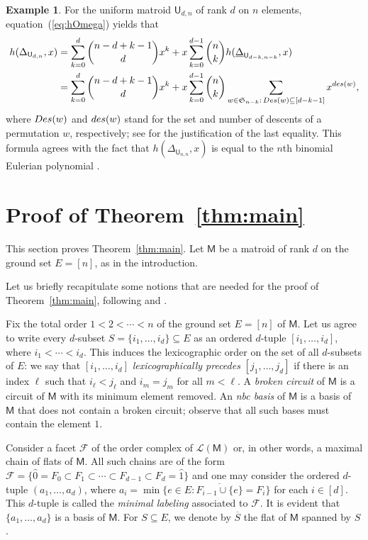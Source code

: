 \documentclass[11pt]{amsart}
\theoremstyle{theorems}
\theoremstyle{definition}
\newtheorem{example}[theorem]{Example}
\newcommand{\des}{{\rm des}}
\newcommand{\Des}{{\rm Des}}
\newcommand{\fS}{{\mathfrak S}}
\newcommand{\M}{{\mathsf{M}}}
\newcommand{\U}{{\mathsf{U}}}
\newcommand{\uDelta}{\underline{\Delta}}
\begin{document}
\begin{example} \label{ex:uniform-h} \rm
For the uniform matroid $\U_{d,n}$ of rank $d$ on $n$ elements, 
equation~(\ref{eq:hOmega}) yields that
%
\begin{align*} 
h(\Delta_{\U_{d,n}}, x) & = \sum_{k=0}^d \binom{n-d+k-1}{d} x^k 
 + x \sum_{k=0}^{d-1} \binom{n}{k} h(\uDelta_{\U_{d-k,n-k}},x) \\ 
	                      & = \sum_{k=0}^d \binom{n-d+k-1}{d} x^k 
 + x \sum_{k=0}^{d-1} \binom{n}{k} \sum_{w \in \fS_{n-k}: \, 
                      \Des(w) \subseteq [d-k-1]} x^{\des(w)},
\end{align*}
%
where $\Des(w)$ and $\des(w)$ stand for the set and number of 
descents of a permutation $w$, respectively; see 
\cite[Example~2.2]{ADK24} for the justification of the last 
equality. This formula agrees with 
the fact that $h(\Delta_{\U_{n,n}}, x)$ is equal to the $n$th 
binomial Eulerian polynomial \cite[Example~5]{BKR22} 
\cite[Section~10.4]{PRW08}. 
\end{example}

\section{Proof of Theorem~\ref{thm:main}}
\label{sec:proof}

This section proves Theorem~\ref{thm:main}. Let $\M$ be a 
matroid of rank $d$ on the ground set $E = [n]$, as in the 
introduction. 

Let us briefly recapitulate some notions that are needed for the 
proof of Theorem~\ref{thm:main}, following \cite[Section~7.3]{Bj92} 
and \cite[Section~4]{NS04}.

Fix the total order $1 < 2 < \cdots < n$ of the ground set $E=[n]$ 
of $\M$. Let us agree to write every $d$-subset 
$S=\{i_1,\ldots,i_d\}\subseteq E$ as an ordered $d$-tuple 
$[i_1,\ldots,i_d]$, where $i_1 < \cdots < i_d$. This induces the 
lexicographic order on the set of all $d$-subsets of $E$: we say 
that $[i_1,\ldots,i_d]$ \emph{lexicographically precedes} 
$[j_1,\ldots,j_d]$ if there is an index $\ell$ such that 
$i_{\ell}<j_{\ell}$ and $i_m=j_m$ for all $m<\ell$. A 
\emph{broken circuit} of $\M$ is a circuit of $\M$ with its 
minimum element removed. An \emph{nbc basis} of $\M$ is a 
basis of $\M$ that does not contain a broken circuit; observe 
that all such bases must contain the element $1$. 

Consider a facet $\mathscr{F}$ of the order complex of 
$\mathcal{L}(\M)$ or, in other words, a maximal chain of flats 
of $\M$. All such chains are of the form $\mathscr{F} = 
\{\widehat{0} = F_0 \subset F_1 \subset\cdots \subset F_{d-1} 
\subset F_d = \widehat{1}\}$ and one may consider the ordered 
$d$-tuple $(a_1,\ldots,a_d)$, where $a_i = \min\{ e \in E : 
\overline{F_{i-1}\cup \{e\}} = F_{i}\}$ for each $i\in [d]$. 
This $d$-tuple is called the \emph{minimal labeling} associated 
to $\mathscr{F}$. It is evident that $\{a_1,\ldots,a_d\}$ is a 
basis of $\M$. 
For $S \subseteq E$, we denote by $\overline{S}$ 
the flat of $\M$ spanned by $S$. 
\end{document}
